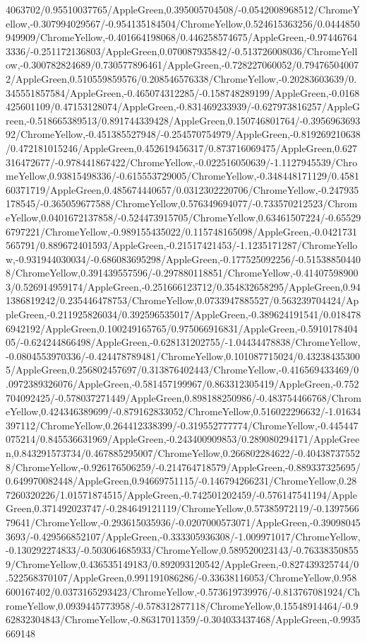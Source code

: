 {\begin{tikzternal}
4063702/0.95510037765/AppleGreen,0.395005704508/-0.0542008968512/ChromeYellow,-0.307994029567/-0.954135184504/ChromeYellow,0.524615363256/0.0444850949909/ChromeYellow,-0.401664198068/0.446258574675/AppleGreen,-0.974467643336/-0.251172136803/AppleGreen,0.070087935842/-0.513726008036/ChromeYellow,-0.300782824689/0.730577896461/AppleGreen,-0.728227060052/0.794765040072/AppleGreen,0.510559859576/0.208546576338/ChromeYellow,-0.20283603639/0.345551857584/AppleGreen,-0.465074312285/-0.158748289199/AppleGreen,-0.0168425601109/0.47153128074/AppleGreen,-0.831469233939/-0.627973816257/AppleGreen,-0.518665389513/0.891744339428/AppleGreen,0.150746801764/-0.395696369392/ChromeYellow,-0.451385527948/-0.254570754979/AppleGreen,-0.819269210638/0.472181015246/AppleGreen,0.452619456317/0.873716069475/AppleGreen,0.627316472677/-0.978441867422/ChromeYellow,-0.022516050639/-1.1127945539/ChromeYellow,0.93815498336/-0.615553729005/ChromeYellow,-0.348448171129/0.458160371719/AppleGreen,0.485674440657/0.0312302220706/ChromeYellow,-0.247935178545/-0.365059677588/ChromeYellow,0.576349694077/-0.733570212523/ChromeYellow,0.0401672137858/-0.524473915705/ChromeYellow,0.63461507224/-0.655296797221/ChromeYellow,-0.989155435022/0.115748165098/AppleGreen,-0.0421731565791/0.889672401593/AppleGreen,-0.21517421453/-1.1235171287/ChromeYellow,-0.931944030034/-0.686083695298/AppleGreen,-0.177525092256/-0.515388504408/ChromeYellow,0.391439557596/-0.297880118851/ChromeYellow,-0.414075989003/0.526914959174/AppleGreen,-0.251666123712/0.354832658295/AppleGreen,0.941386819242/0.235446478753/ChromeYellow,0.0733947885527/0.563239704424/AppleGreen,-0.211925826034/0.392596535017/AppleGreen,-0.389624191541/0.0184786942192/AppleGreen,0.100249165765/0.975066916831/AppleGreen,-0.591017840405/-0.624244866498/AppleGreen,-0.628131202755/-1.04434478838/ChromeYellow,-0.0804553970336/-0.424478789481/ChromeYellow,0.101087715024/0.432384353005/AppleGreen,0.256802457697/0.313876402443/ChromeYellow,-0.416569433469/0.0972389326076/AppleGreen,-0.581457199967/0.863312305419/AppleGreen,-0.752704092425/-0.578037271449/AppleGreen,0.898188250986/-0.483754466768/ChromeYellow,0.424346389699/-0.879162833052/ChromeYellow,0.516022296632/-1.01634397112/ChromeYellow,0.264412338399/-0.319552777774/ChromeYellow,-0.445447075214/0.845536631969/AppleGreen,-0.243400909853/0.289080294171/AppleGreen,0.843291573734/0.467885295007/ChromeYellow,0.266802284622/-0.404387375528/ChromeYellow,-0.926176506259/-0.214764718579/AppleGreen,-0.889337325695/0.649970082448/AppleGreen,0.94669751115/-0.146794266231/ChromeYellow,0.287260320226/1.01571874515/AppleGreen,-0.742501202459/-0.576147541194/AppleGreen,0.371492023747/-0.284649121119/ChromeYellow,0.57385972119/-0.139756679641/ChromeYellow,-0.293615035936/-0.0207000573071/AppleGreen,-0.390980453693/-0.429566852107/AppleGreen,-0.333305936308/-1.009971017/ChromeYellow,-0.130292274833/-0.503064685933/ChromeYellow,0.589520023143/-0.763383508559/ChromeYellow,0.436535149183/0.892093120542/AppleGreen,-0.827439325744/0.522568370107/AppleGreen,0.991191086286/-0.33638116053/ChromeYellow,0.958600167402/0.0373165293423/ChromeYellow,-0.573619739976/-0.813767081924/ChromeYellow,0.0939445773958/-0.578312877118/ChromeYellow,0.15548914464/-0.962832304843/ChromeYellow,-0.86317011359/-0.304033437468/AppleGreen,-0.9935669148
\end{tikzternal}}
